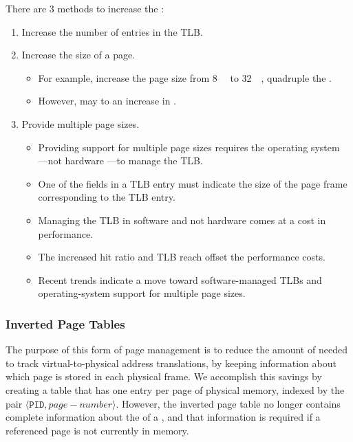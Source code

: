 There are 3 methods to increase the :
\begin{enumerate}[noitemsep]
\item Increase the number of entries in the TLB.\@

\item Increase the size of a page.
  \begin{itemize}[noitemsep]
  \item For example, increase the page size from \SI{8}{\kibi{} \byte{}} to \SI{32}{\kibi{} \byte{}}, quadruple the .
  \item However, may to an increase in .
  \end{itemize}

\item Provide multiple page sizes.
  \begin{itemize}[noitemsep]
  \item Providing support for multiple page sizes requires the operating system
    —not hardware —to manage the TLB.\@
  \item One of the fields in a TLB entry must indicate the size of the page frame corresponding to the TLB entry.
  \item Managing the TLB in software and not hardware comes at a cost in performance.
  \item The increased hit ratio and TLB reach offset the performance costs.
  \item Recent trends indicate a move toward software-managed TLBs and operating-system support for multiple page sizes.
  \end{itemize}
\end{enumerate}

\subsubsection{Inverted Page Tables}\label{subsubsec:Virtual_Memory-Inverted_Page_Tables}
The purpose of this form of page management is to reduce the amount of  needed to track virtual-to-physical address translations, by keeping information about which  page is stored in each physical frame.
We accomplish this savings by creating a table that has one entry per page of physical memory, indexed by the pair $\langle \mathtt{PID}, page-number \rangle$.
However, the inverted page table no longer contains complete information about the  of a , and that information is required if a referenced page is not currently in memory.

